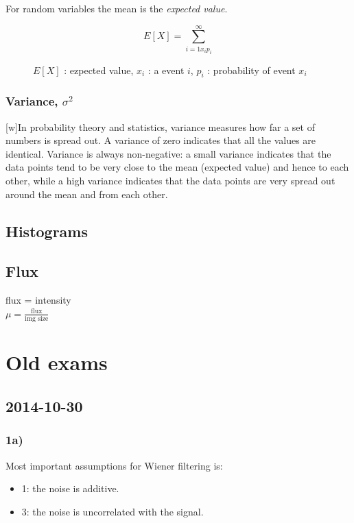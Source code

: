 \documentclass[12pt]{article}
\begin{document}
            For random variables the mean is the \textit{expected value}.
            \begin{figure}
\[ E[X] = \sum^{\infty}_{i=1{x_ip_i}} \]
\caption{$E[X]$ : ezpected value, $x_i$ : a event $i$, $p_i$ : probability of event $x_i$}
\end{figure}
        \subsubsection*{Variance, $\sigma^2$}    
         
         

        [w]In probability theory and statistics, variance measures how far a set of numbers is spread out. A variance of zero indicates that all the values are identical. Variance is always non-negative: a small variance indicates that the data points tend to be very close to the mean (expected value) and hence to each other, while a high variance indicates that the data points are very spread out around the mean and from each other.
        
    \subsection{Histograms}
    
    \subsection{Flux}
        flux = intensity\\
        $\mu = \frac{\text{flux}}{\text{img size}}$
    
\section{Old exams}
    \subsection*{2014-10-30}
    \subsubsection*{1a)}
        Most important assumptions for Wiener filtering is: 
    \begin{itemize}
        \item{1: the noise is additive.}
        \item{3: the noise is uncorrelated with the signal.}
    \end{itemize}
    
\end{document}
